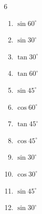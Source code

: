 \begin{multicols}{6}
\begin{enumerate}
        \phantom{$\displaystyle =1$}

  \item $\displaystyle \sin{60^\circ}$


  \item $\displaystyle \sin{30^\circ}$


  \item $\displaystyle \tan{30^\circ}$


  \item $\displaystyle \tan{60^\circ}$


  \item $\displaystyle \sin{45^\circ}$


\columnbreak %

  \item $\displaystyle \cos{60^\circ}$


  \item $\displaystyle \tan{45^\circ}$

        \phantom{$\displaystyle =1$}

  \item $\displaystyle \cos{45^\circ}$


  \item $\displaystyle \sin{30^\circ}$


  \item $\displaystyle \cos{30^\circ}$


  \item $\displaystyle \sin{45^\circ}$


  \item $\displaystyle \sin{30^\circ}$



\end{enumerate}
\end{multicols}
